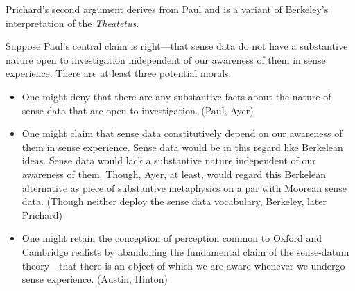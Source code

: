 \documentclass[11pt]{article}
\begin{document}
Prichard's second argument derives from Paul and is a variant of Berkeley's interpretation of the \emph{Theatetus}. 

Suppose Paul's central claim is right---that sense data do not have a substantive nature open to investigation independent of our awareness of them in sense experience. There are at least three potential morals:

\begin{itemize}
	\item One might deny that there are any substantive facts about the nature of sense data that are open to investigation. (Paul, Ayer)
	\item One might claim that sense data constitutively depend on our awareness of them in sense experience. Sense data would be in this regard like Berkelean ideas. Sense data would lack a substantive nature independent of our awareness of them. Though, Ayer, at least, would regard this Berkelean alternative as piece of substantive metaphysics on a par with Moorean sense data. (Though neither deploy the sense data vocabulary, Berkeley, later Prichard)
	\item One might retain the conception of perception common to Oxford and Cambridge realists by abandoning the fundamental claim of the sense-datum theory---that there is an object of which we are aware whenever we undergo sense experience. (Austin, Hinton)
\end{itemize}



 

\end{document}
